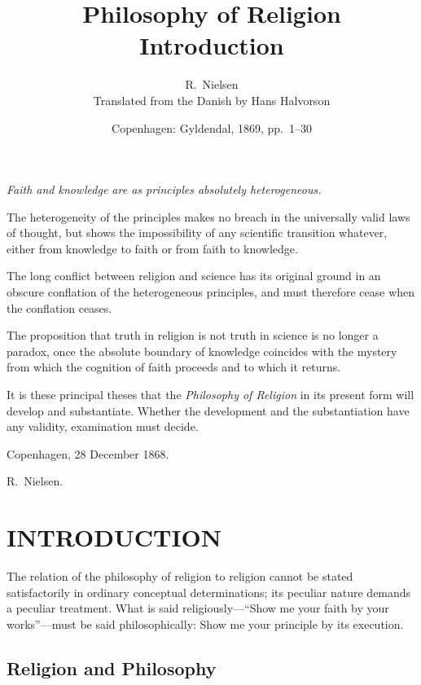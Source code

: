 \documentclass[12pt,a4paper]{article}
\title{\textbf{Philosophy of Religion}\\[6pt]
  \large Introduction}
\author{R.\ Nielsen\\[4pt]
  \small Translated from the Danish by Hans Halvorson}
\date{Copenhagen: Gyldendal, 1869, pp.\ 1--30}
\begin{document}
\maketitle
\thispagestyle{fancy}

\bigskip

\begin{center}
\itshape
Faith and knowledge are as principles absolutely heterogeneous.

\smallskip

The heterogeneity of the principles makes no breach in the
universally valid laws of thought, but shows the impossibility
of any scientific transition whatever, either from knowledge to
faith or from faith to knowledge.

\smallskip

The long conflict between religion and science has its original
ground in an obscure conflation of the heterogeneous principles,
and must therefore cease when the conflation ceases.

\smallskip

The proposition that truth in religion is not truth in science
is no longer a paradox, once the absolute boundary of knowledge
coincides with the mystery from which the cognition of faith
proceeds and to which it returns.

\smallskip

It is these principal theses that the \emph{Philosophy of
Religion} in its present form will develop and substantiate.
Whether the development and the substantiation have any
validity, examination must decide.

\bigskip
Copenhagen, 28 December 1868.

R.\ Nielsen.
\end{center}

\bigskip\bigskip

\section*{INTRODUCTION}

The relation of the philosophy of religion to religion cannot be
stated satisfactorily in ordinary conceptual determinations; its
peculiar nature demands a peculiar treatment. What is said
religiously---``Show me your faith by your works''---must be
said philosophically: Show me your principle by its execution.

\subsection*{Religion and Philosophy}
\end{document}
